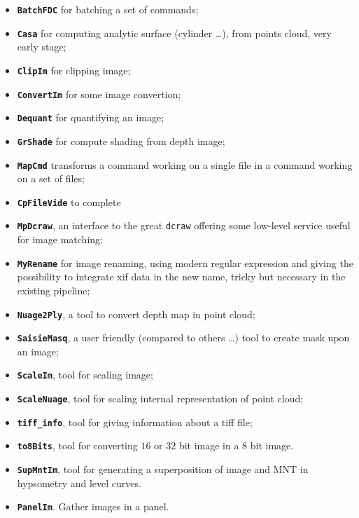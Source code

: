 \begin{itemize}
   \item {\tt \bf BatchFDC} for batching a set of commands;

   \item {\tt \bf Casa} for computing analytic surface (cylinder \dots),
                        from points cloud, very early stage;

   \item {\tt \bf ClipIm} for clipping image;

   \item {\tt \bf ConvertIm} for some image convertion;

   \item {\tt \bf Dequant} for quantifying an image;

   \item {\tt \bf GrShade} for compute shading from depth image;

   \item {\tt \bf MapCmd} transforms a command working on a single file in a command
         working on a set of files;

   \item {\tt \bf CpFileVide}   to complete

   \item {\tt \bf MpDcraw}, an interface to the great {\tt dcraw} offering some low-level
         service useful for image matching;

   \item {\tt \bf MyRename} for image renaming, using modern regular expression and giving the possibility
         to integrate xif data in the new name, tricky but necessary in the existing pipeline;

    \item {\tt \bf Nuage2Ply}, a tool to convert depth map in point cloud;

   \item {\tt \bf SaisieMasq}, a user friendly (compared to others \dots) tool to create
         mask upon an image;

   \item {\tt \bf ScaleIm}, tool for scaling image;

   \item {\tt \bf ScaleNuage}, tool for scaling internal representation of point cloud;

   \item {\tt \bf tiff\_info}, tool for giving information about a tiff file;

   \item {\tt \bf to8Bits}, tool for converting $16$ or $32$ bit image in a $8$ bit image.

   \item {\tt \bf SupMntIm}, tool for generating a superposition of image and MNT in hypsometry 
         and level curves.

   \item {\tt \bf PanelIm}. Gather images in a panel.
\end{itemize}









